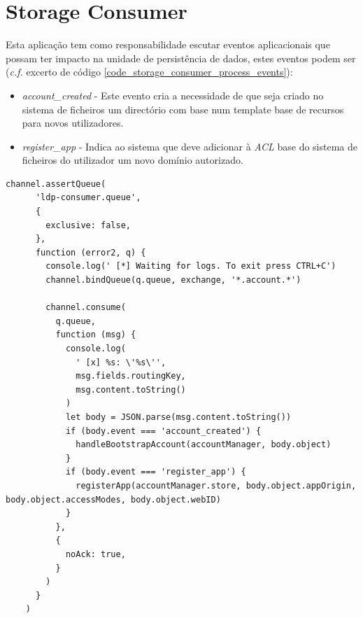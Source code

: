 \section{Storage Consumer}
Esta aplicação tem como responsabilidade escutar eventos aplicacionais que possam ter impacto na unidade de persistência de dados, estes eventos podem ser (\emph{c.f.} excerto de código \ref{code_storage_consumer_process_events}):
\begin{itemize}
    \item \emph{account\_created} - Este evento cria a necessidade de que seja criado no sistema de ficheiros um directório com base num template base de recursos para novos utilizadores.
    \item \emph{register\_app} - Indica ao sistema que deve adicionar à \emph{\acrshort{ACL}} base do sistema de ficheiros do utilizador um novo domínio autorizado.
\end{itemize}

\newpara
\newpara
\newpara
\newpara

\begin{lstlisting}[caption={\emph{Consumer} responsável por interpretar os eventos aplicacionais com impacto no sistema de ficheiros}, label={code_storage_consumer_process_events}]
channel.assertQueue(
      'ldp-consumer.queue',
      {
        exclusive: false,
      },
      function (error2, q) {
        console.log(' [*] Waiting for logs. To exit press CTRL+C')
        channel.bindQueue(q.queue, exchange, '*.account.*')

        channel.consume(
          q.queue,
          function (msg) {
            console.log(
              ' [x] %s: \'%s\'',
              msg.fields.routingKey,
              msg.content.toString()
            )
            let body = JSON.parse(msg.content.toString())
            if (body.event === 'account_created') {
              handleBootstrapAccount(accountManager, body.object)
            }
            if (body.event === 'register_app') {
              registerApp(accountManager.store, body.object.appOrigin, body.object.accessModes, body.object.webID)
            }
          },
          {
            noAck: true,
          }
        )
      }
    )

\end{lstlisting}

